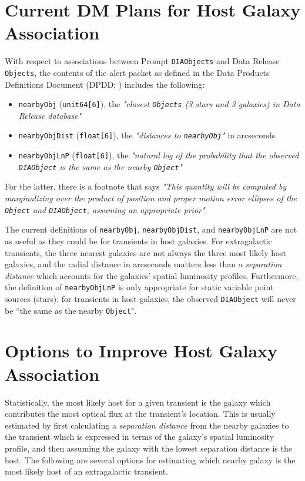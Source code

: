 \documentclass[DM,lsstdraft,authoryear,toc]{lsstdoc}
\begin{document}
\section{Current DM Plans for Host Galaxy Association}\label{sec:DMplans}

With respect to associations between Prompt {\tt DIAObjects} and Data Release {\tt Objects}, the contents of the alert packet as defined in the Data Products Definitions Document (DPDD; ) includes the following:
\begin{itemize}
\item {\tt nearbyObj} ({\tt unit64[6]}), the {\it "closest {\tt Objects} (3 stars and 3 galaxies) in Data Release database"}
\item {\tt nearbyObjDist} ({\tt float[6]}), the {\it "distances to {\tt nearbyObj}"} in arcseconds
\item {\tt nearbyObjLnP} ({\tt float[6]}), the {\it "natural log of the probability that the observed {\tt DIAObject} is the same as the nearby {\tt Object}"}
\end{itemize}
For the latter, there is a footnote that says {\it "This quantity will be computed by marginalizing over the product of position and proper motion error ellipses of the {\tt Object} and {\tt DIAObject}, assuming an appropriate prior"}.

The current definitions of {\tt nearbyObj}, {\tt nearbyObjDist}, and {\tt nearbyObjLnP} are not as useful as they could be for transients in host galaxies. 
For extragalactic transients, the three nearest galaxies are not always the three most likely host galaxies, and the radial distance in arcseconds matters less than a \emph{separation distance} which accounts for the galaxies' spatial luminosity profiles.
Furthermore, the definition of {\tt nearbyObjLnP} is only appropriate for static variable point sources (stars): for transients in host galaxies, the observed {\tt DIAObject} will never be ``the same as the nearby {\tt Object}".


\section{Options to Improve Host Galaxy Association}\label{sec:options}

Statistically, the most likely host for a given transient is the galaxy which contributes the most optical flux at the transient's location.
This is usually estimated by first calculating a \emph{separation distance} from the nearby galaxies to the transient which is expressed in terms of the galaxy's spatial luminosity profile, and then assuming the galaxy with the lowest separation distance is the host.
The following are several options for estimating which nearby galaxy is the most likely host of an extragalactic transient.
\end{document}
